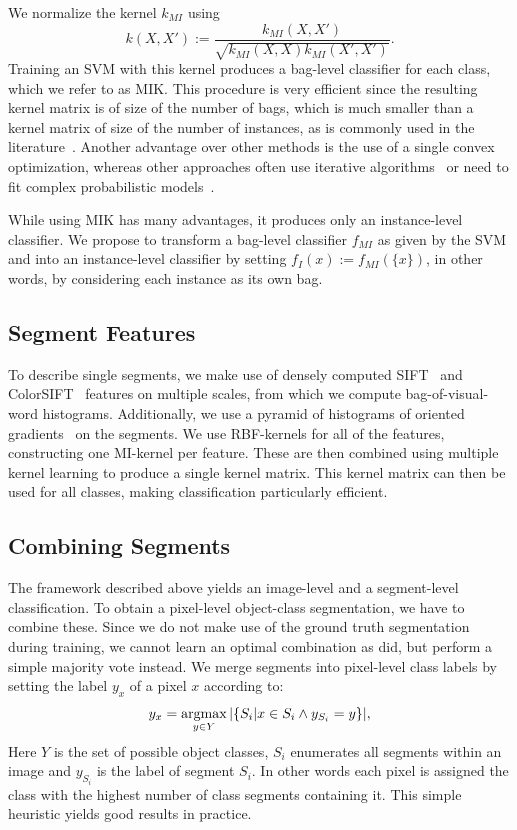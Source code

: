 We normalize the kernel $k_{MI}$ \citep{gaertner2002multi} using
\begin{equation}
k(X,X') := \frac{k_{MI}(X,X')}{\sqrt{k_{MI}(X,X)k_{MI}(X',X')}}.
\end{equation}
Training an SVM with this kernel produces a bag-level classifier for each
class, which we refer to as MIK\@.  This procedure is very efficient since
the resulting kernel matrix is of size of the number of bags, which is much smaller
than a kernel matrix of size of the number of instances, as is commonly used in the
literature~\citep{andrews2003support,nguyen2010new,zhang2008m3miml}. Another
advantage over other methods is the use of a single convex optimization,
whereas other approaches often use iterative
algorithms~\citep{andrews2003support} or need to fit complex probabilistic
models~\citep{zha2008joint}.

While using MIK has many advantages, it produces only an instance-level
classifier. We propose to transform a bag-level classifier $f_{MI}$ as given by
the SVM and  into an instance-level classifier by setting
$f_{I}(x):=f_{MI}(\{x\})$, in other words, by considering each instance as its own
bag. 

\subsection{Segment Features}

To describe single segments, we make use of densely computed
SIFT~\citep{lowe2004distinctive} and ColorSIFT~\citep{van2009evaluating}
features on multiple scales, from which we compute bag-of-visual-word histograms. Additionally, we
use a pyramid of histograms of oriented gradients~\citep{dalal2005histograms} on the
segments.  We use RBF-kernels for all of the features, constructing one
MI-kernel per feature. These are then combined using multiple kernel learning
to produce a single kernel matrix. This kernel matrix can then be used for all
classes, making classification particularly efficient.

\subsection{Combining Segments}

The framework described above yields an image-level and a segment-level
classification.  To obtain a pixel-level object-class segmentation, we have to
combine these.  Since we do not make use of the ground truth segmentation
during training, we cannot learn an optimal combination as
\citet{li2010object} did, but perform a simple majority vote instead.  We merge
segments into pixel-level class labels by setting the label $y_x$ of a pixel
$x$ according to:
\begin{equation}
    y_x = \operatorname*{argmax}_{y \in Y} |\{S_i | x \in S_i \land y_{S_i}=y \}|,
\end{equation}
Here $Y$ is the set of possible object classes, $S_i$ enumerates all segments within an
image and $y_{S_i}$ is the label of segment $S_i$. In other words each pixel is
assigned the class with the highest number of class segments containing it.
This simple heuristic yields good results in practice.

